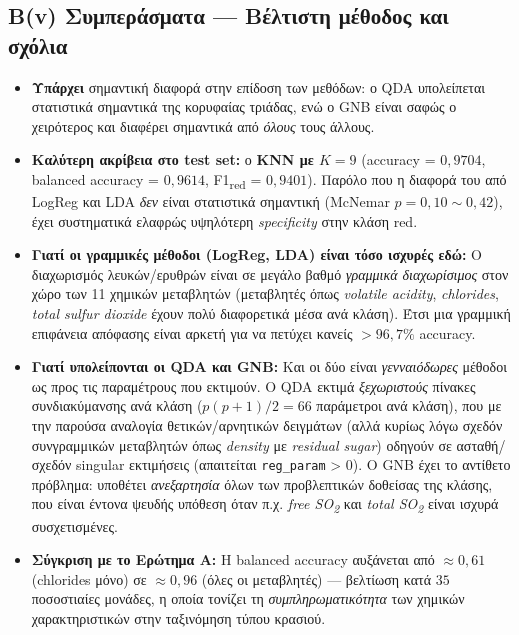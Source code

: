\documentclass[11pt,a4paper]{article}
\newcommand{\code}[1]{\texttt{#1}}
\begin{document}
\subsection{Β(v) Συμπεράσματα — Βέλτιστη μέθοδος και σχόλια}

\begin{itemize}[leftmargin=1.5cm]
    \item \textbf{Υπάρχει} σημαντική διαφορά στην επίδοση των μεθόδων:
    ο QDA υπολείπεται στατιστικά σημαντικά της κορυφαίας τριάδας, ενώ ο
    GNB είναι σαφώς ο χειρότερος και διαφέρει σημαντικά από \emph{όλους}
    τους άλλους.

    \item \textbf{Καλύτερη ακρίβεια στο test set:} ο
    \textbf{KNN με $K = 9$} (accuracy = $0{,}9704$, balanced accuracy
    = $0{,}9614$, F1\textsubscript{red} = $0{,}9401$). Παρόλο που η
    διαφορά του από LogReg και LDA \emph{δεν} είναι στατιστικά
    σημαντική (McNemar $p = 0{,}10\sim 0{,}42$), έχει συστηματικά
    ελαφρώς υψηλότερη \textit{specificity} στην κλάση red.

    \item \textbf{Γιατί οι γραμμικές μέθοδοι (LogReg, LDA) είναι τόσο
    ισχυρές εδώ:} Ο διαχωρισμός λευκών/ερυθρών είναι σε μεγάλο βαθμό
    \emph{γραμμικά διαχωρίσιμος} στον χώρο των 11 χημικών μεταβλητών
    (μεταβλητές όπως \textit{volatile acidity}, \textit{chlorides},
    \textit{total sulfur dioxide} έχουν πολύ διαφορετικά μέσα ανά
    κλάση). Έτσι μια γραμμική επιφάνεια απόφασης είναι αρκετή για να
    πετύχει κανείς $> 96{,}7\%$ accuracy.

    \item \textbf{Γιατί υπολείπονται οι QDA και GNB:} Και οι δύο είναι
    \emph{γενναιόδωρες} μέθοδοι ως προς τις παραμέτρους που εκτιμούν.
    Ο QDA εκτιμά \emph{ξεχωριστούς} πίνακες συνδιακύμανσης ανά κλάση
    ($p(p+1)/2 = 66$ παράμετροι ανά κλάση), που με την παρούσα
    αναλογία θετικών/αρνητικών δειγμάτων (αλλά κυρίως λόγω σχεδόν
    συνγραμμικών μεταβλητών όπως \textit{density} με
    \textit{residual sugar}) οδηγούν σε ασταθή/σχεδόν singular
    εκτιμήσεις (απαιτείται \code{reg\_param} > 0). Ο GNB έχει το
    αντίθετο πρόβλημα: υποθέτει \emph{ανεξαρτησία} όλων των
    προβλεπτικών δοθείσας της κλάσης, που είναι έντονα ψευδής
    υπόθεση όταν π.χ. \textit{free SO\textsubscript{2}} και
    \textit{total SO\textsubscript{2}} είναι ισχυρά συσχετισμένες.

    \item \textbf{Σύγκριση με το Ερώτημα Α:} Η balanced accuracy
    αυξάνεται από $\approx 0{,}61$ (chlorides μόνο) σε $\approx 0{,}96$
    (όλες οι μεταβλητές) — βελτίωση κατά $35$ ποσοστιαίες μονάδες, η
    οποία τονίζει τη \emph{συμπληρωματικότητα} των χημικών
    χαρακτηριστικών στην ταξινόμηση τύπου κρασιού.
\end{itemize}
\end{document}

